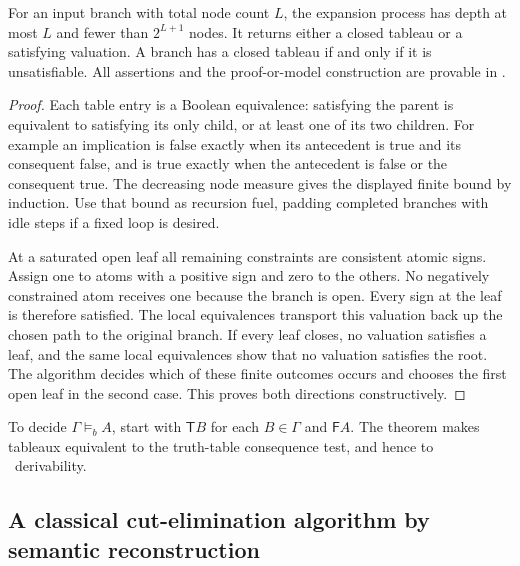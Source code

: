 \begin{theorem}\label{thm:tableaux}
For an input branch with total node count $L$, the expansion process has
depth at most $L$ and fewer than $2^{L+1}$ nodes. It returns either a closed
tableau or a satisfying valuation. A branch has a closed tableau if and
only if it is unsatisfiable. All assertions and the proof-or-model
construction are provable in \ipra.
\end{theorem}
\begin{proof}
Each table entry is a Boolean equivalence: satisfying the parent is
equivalent to satisfying its only child, or at least one of its two
children. For example an implication is false exactly when its antecedent
is true and its consequent false, and is true exactly when the antecedent
is false or the consequent true. The decreasing node measure gives the
displayed finite bound by induction. Use that bound as recursion fuel,
padding completed branches with idle steps if a fixed loop is desired.

At a saturated open leaf all remaining constraints are consistent atomic
signs. Assign one to atoms with a positive sign and zero to the others.
No negatively constrained atom receives one because the branch is open.
Every sign at the leaf is therefore satisfied. The local equivalences
transport this valuation back up the chosen path to the original branch.
If every leaf closes, no valuation satisfies a leaf, and the same local
equivalences show that no valuation satisfies the root. The algorithm
decides which of these finite outcomes occurs and chooses the first open
leaf in the second case. This proves both directions constructively.
\end{proof}

To decide $\Gamma\models_b A$, start with $\mathsf T B$ for each
$B\in\Gamma$ and $\mathsf F A$. The theorem makes tableaux equivalent to
the truth-table consequence test, and hence to \CPC\ derivability.

\subsection{A classical cut-elimination algorithm by semantic reconstruction}

